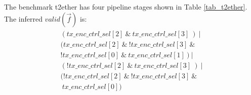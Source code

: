 \documentclass[conference]{IEEEtran}
\begin{document}
The benchmark t2ether has four pipeline stages shown in Table \ref{tab_t2ether}.
The inferred $valid(\vec{f})$ is:
\begin{multline}
\begin{array}{l}
( tx\_enc\_ctrl\_sel[2]~\&~tx\_enc\_ctrl\_sel[3]~)~| \\
( tx\_enc\_ctrl\_sel[2]~\&~!tx\_enc\_ctrl\_sel[3]~\& \\!tx\_enc\_ctrl\_sel[0]~\&~tx\_enc\_ctrl\_sel[1]~)~| \\
( !tx\_enc\_ctrl\_sel[2]~\&~tx\_enc\_ctrl\_sel[3]~)~| \\
( !tx\_enc\_ctrl\_sel[2]~\&~!tx\_enc\_ctrl\_sel[3]~\& \\~tx\_enc\_ctrl\_sel[0] )
\end{array}
\end{multline}

% 
% 
% 
% 
\end{document}
